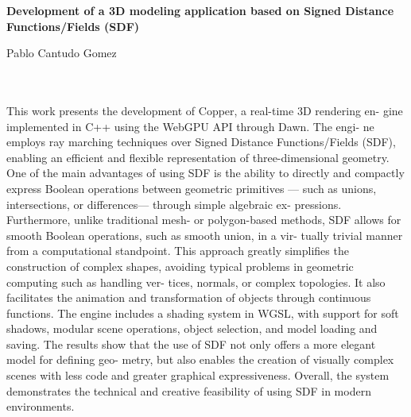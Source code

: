 \thispagestyle{empty}


\begin{center}
{\large\bfseries Development of a 3D modeling application based on Signed
Distance Functions/Fields (SDF)}\\
\end{center}
\begin{center}
Pablo Cantudo Gomez \\
\end{center}

\\

\vspace{0.7cm}
\\

This work presents the development of Copper, a real-time 3D rendering en-
gine implemented in C++ using the WebGPU API through Dawn. The engi-
ne employs ray marching techniques over Signed Distance Functions/Fields
(SDF), enabling an efficient and flexible representation of three-dimensional
geometry. One of the main advantages of using SDF is the ability to directly
and compactly express Boolean operations between geometric primitives —
such as unions, intersections, or differences— through simple algebraic ex-
pressions. Furthermore, unlike traditional mesh- or polygon-based methods,
SDF allows for smooth Boolean operations, such as smooth union, in a vir-
tually trivial manner from a computational standpoint.
\bigbreak
This approach greatly simplifies the construction of complex shapes,
avoiding typical problems in geometric computing such as handling ver-
tices, normals, or complex topologies. It also facilitates the animation and
transformation of objects through continuous functions. The engine includes
a shading system in WGSL, with support for soft shadows, modular scene
operations, object selection, and model loading and saving. The results show
that the use of SDF not only offers a more elegant model for defining geo-
metry, but also enables the creation of visually complex scenes with less code
and greater graphical expressiveness. Overall, the system demonstrates the
technical and creative feasibility of using SDF in modern environments.

\chapter*{}
\thispagestyle{empty}

